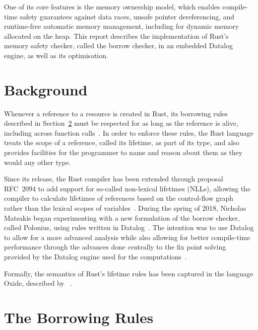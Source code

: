 \documentclass{UUThesisTemplate}
\begin{document}
One of its core features is the memory ownership model, which enables
compile-time safety guarantees against data races, unsafe pointer dereferencing,
and runtime-free automatic memory management, including for dynamic memory
allocated on the heap. This report describes the implementation of Rust's memory
safety checker, called the borrow checker, in an embedded Datalog engine, as
well as its optimisation.

\section{Background}
Whenever a reference to a resource is created in Rust, its borrowing rules
described in Section~\ref{sec:borrowing-rules} must be respected for as long as
the reference is alive, including across function
calls~\cite{nichols_rust_nodate}. In order to enforce these rules, the Rust
language treats the scope of a reference, called its lifetime, as part of its
type, and also provides facilities for the programmer to name and reason about
them as they would any other type.

Since its release, the Rust compiler has been extended through proposal RFC~2094
to add support for so-called non-lexical lifetimes (NLLs), allowing the compiler
to calculate lifetimes of references based on the control-flow graph rather than
the lexical scopes of variables~\cite{noauthor_rfc_2019}. During the spring of
2018, Nicholas Matsakis began experimenting with a new formulation of the borrow
checker, called Polonius, using rules written in
Datalog~\cite{matsakis_alias-based_2018}. The intention was to use Datalog to
allow for a more advanced analysis while also allowing for better compile-time
performance through the advances done centrally to the fix point solving
provided by the Datalog engine used for the computations~\cite{datafrog}.

Formally, the semantics of Rust's lifetime rules has been captured in the
language Oxide, described by
\citeauthor{weiss_oxide:_2019}~\cite{weiss_oxide:_2019}.


\section{The Borrowing Rules}\label{sec:borrowing-rules}
\end{document}
